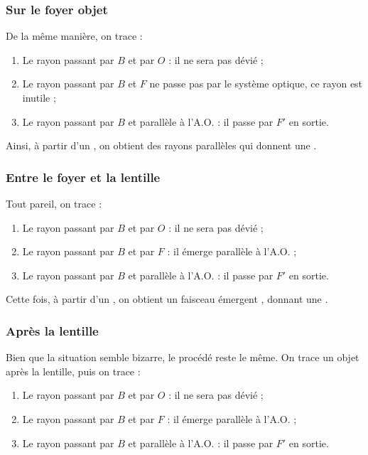 \documentclass[10pt,a5paper,notitlepage]{book}
\begin{document}
\subsubsection{Sur le foyer objet}
De la même manière, on trace :
\begin{enumerate}
    \item Le rayon passant par $B$ et par $O$ : il ne sera pas dévié ;
    \item Le rayon passant par $B$ et $F$ ne passe pas par le système optique,
        ce rayon est inutile ;
    \item Le rayon passant par $B$ et parallèle à l'A.O. : il passe par $F'$ en
        sortie.
\end{enumerate}

Ainsi, à partir d'un , on obtient des rayons parallèles
qui donnent une .

\subsubsection{Entre le foyer et la lentille}\label{eflc}
Tout pareil, on trace :
\begin{enumerate}
    \item Le rayon passant par $B$ et par $O$ : il ne sera pas dévié ;
    \item Le rayon passant par $B$ et par $F$ : il émerge parallèle à l'A.O. ;
    \item Le rayon passant par $B$ et parallèle à l'A.O. : il passe par $F'$ en
        sortie.
\end{enumerate}

Cette fois, à partir d'un , on obtient un faisceau
émergent , donnant une .

\subsubsection{Après la lentille}
Bien que la situation semble bizarre, le procédé reste le même. On
trace un objet après la lentille, puis on trace :
\begin{enumerate}
    \item Le rayon passant par $B$ et par $O$ : il ne sera pas dévié ;
    \item Le rayon passant par $B$ et par $F$ : il émerge parallèle à l'A.O. ;
    \item Le rayon passant par $B$ et parallèle à l'A.O. : il passe par $F'$ en
        sortie.
\end{enumerate}
\end{document}
